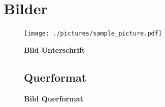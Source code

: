 \documentclass[a4,12pt]{scrartcl}
\begin{document}
\section{Bilder}
\begin{figure} [H]
	\begin{center}
	\texttt{[image: ./pictures/sample\_picture.pdf]}
	\caption{\textbf{Bild Unterschrift}}
	\label{Bild Referenz}
	\end{center}
\end{figure}

\begin{landscape}
\begin{figure}[htbp]
\subsection{Querformat}
\centering
{}
\caption{\textbf{Bild Querformat}}
\end{figure}
\end{landscape}	
\end{document}
